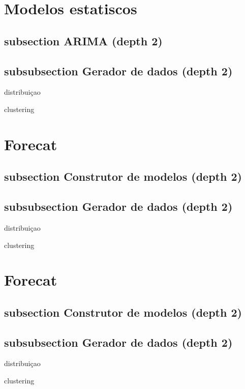 \section{Modelos estatiscos  \label{se:dados_estudo}}

\subsection{subsection ARIMA (depth 2)}

\subsection{subsubsection Gerador de dados (depth 2)}
distribuiçao

clustering




\section{Forecat  \label{se:dados_estudo}}

\subsection{subsection Construtor de modelos (depth 2)}

\subsection{subsubsection Gerador de dados (depth 2)}
distribuiçao

clustering


\section{Forecat  \label{se:dados_estudo}}

\subsection{subsection Construtor de modelos (depth 2)}

\subsection{subsubsection Gerador de dados (depth 2)}
distribuiçao

clustering


